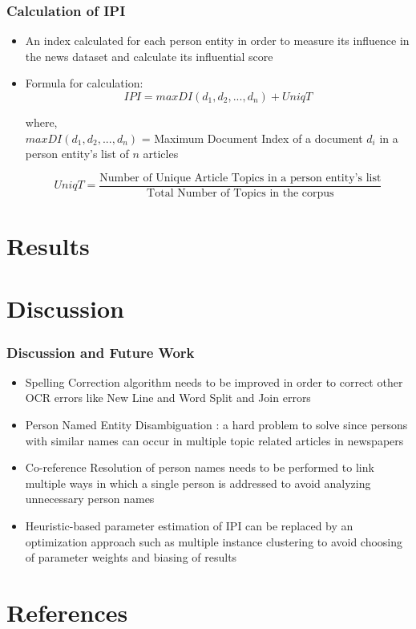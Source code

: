 \documentclass{beamer}
\begin{document}
\begin{frame}
\frametitle{Calculation of IPI}
\begin{itemize}
\item
An index calculated for each person entity in order to measure its influence in the news dataset and calculate its influential score
\item
Formula for calculation:
$$IPI= max DI(d_1, d_2, ...,d_n)+ UniqT$$

where, \\
 $max DI(d_1, d_2, ...,d_n)$ = Maximum Document Index of a document $d_i$ in a person entity's list of  $n$ articles

$$UniqT = \dfrac{\text{Number of Unique Article Topics in a person entity's list}}{\text{Total Number of Topics in the corpus}}$$

\end{itemize}
\end{frame}

\section{Results}
\begin{frame}

\end{frame}

\section{Discussion}
\begin{frame}
\frametitle{Discussion and Future Work}
\begin{itemize}
\item
Spelling Correction algorithm needs to be improved in order to correct other OCR errors like New Line and Word Split and Join errors
\item
Person Named Entity Disambiguation : a hard problem to solve since persons with similar names can occur in multiple topic related articles in newspapers
\item
Co-reference Resolution of person names needs to be performed to link multiple ways in which a single person is addressed to avoid analyzing unnecessary person names
\item
Heuristic-based parameter estimation of IPI can be replaced by an optimization approach such as multiple instance clustering to avoid choosing of parameter weights  and biasing of results 
\end{itemize}
\end{frame}

\section*{References}
\begin{frame}

\end{frame}
\end{document}
